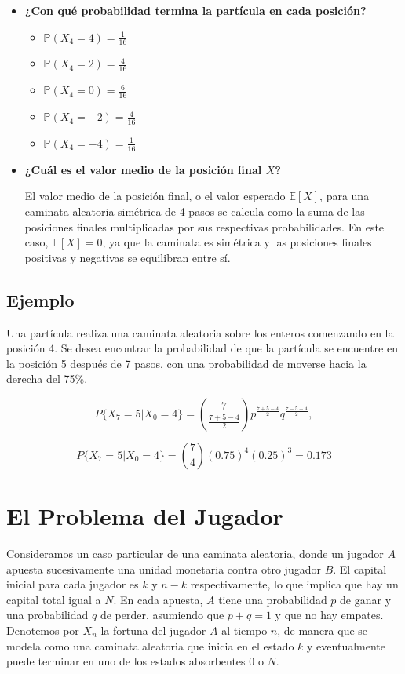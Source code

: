 \documentclass{article}
\begin{document}
\begin{itemize}
    \item \textbf{¿Con qué probabilidad termina la partícula en cada posición?}

          \begin{itemize}
              \item $\mathbb{P}(X_4 = 4) = \frac{1}{16}$
              \item $\mathbb{P}(X_4 = 2) = \frac{4}{16}$
              \item $\mathbb{P}(X_4 = 0) = \frac{6}{16}$
              \item $\mathbb{P}(X_4 = -2) = \frac{4}{16}$
              \item $\mathbb{P}(X_4 = -4) = \frac{1}{16}$
          \end{itemize}

    \item \textbf{¿Cuál es el valor medio de la posición final \( X \)?}

          El valor medio de la posición final, o el valor esperado \( \mathbb{E}[X] \), para una caminata aleatoria simétrica de 4 pasos se calcula como la suma de las posiciones finales multiplicadas por sus respectivas probabilidades. En este caso, \( \mathbb{E}[X] = 0 \), ya que la caminata es simétrica y las posiciones finales positivas y negativas se equilibran entre sí.
\end{itemize}

\subsection*{Ejemplo}

Una partícula realiza una caminata aleatoria sobre los enteros comenzando en la posición 4. Se desea encontrar la probabilidad de que la partícula se encuentre en la posición 5 después de 7 pasos, con una probabilidad de moverse hacia la derecha del 75\%.

\[
    P\{X_7 = 5 | X_0 = 4\} = \binom{7}{\frac{7 + 5 - 4}{2}} p^{\frac{7 + 5 - 4}{2}} q^{\frac{7 - 5 + 4}{2}},
\]

\[
    P\{X_7 = 5 | X_0 = 4\} = \binom{7}{4} (0.75)^{4} (0.25)^{3} = 0.173
\]

\newpage

\section{El Problema del Jugador}

Consideramos un caso particular de una caminata aleatoria, donde un jugador \(A\) apuesta sucesivamente una unidad monetaria contra otro jugador \(B\). El capital inicial para cada jugador es \(k\) y \(n-k\) respectivamente, lo que implica que hay un capital total igual a \(N\). En cada apuesta, \(A\) tiene una probabilidad \(p\) de ganar y una probabilidad \(q\) de perder, asumiendo que \(p + q = 1\) y que no hay empates. Denotemos por \(X_n\) la fortuna del jugador \(A\) al tiempo \(n\), de manera que se modela como una caminata aleatoria que inicia en el estado \(k\) y eventualmente puede terminar en uno de los estados absorbentes \(0\) o \(N\).
\end{document}
